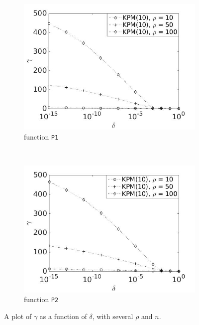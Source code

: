 \begin{figure}[H]
        \begin{subfigure}[b]{0.45\textwidth}
                \includegraphics[width=\textwidth]{fig/s13antvstol1m10}
                \caption{function \texttt{P1}}
                \label{fig:gammadelta3}
        \end{subfigure}
~
        \begin{subfigure}[b]{0.45\textwidth}
                \includegraphics[width=\textwidth]{fig/s14antvstol2m10}
                \caption{ function \texttt{P2}}
                \label{fig:gammadelta4}
        \end{subfigure}
        
        \caption{A plot of $\gamma$ as a function of $\delta$, with several $\rho$ and $n$.} \label{fig:gammadelta}
\end{figure}

